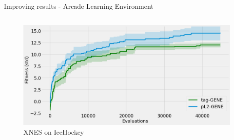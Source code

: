 \begin{frame}{\tciii{} Improving results - Arcade Learning Environment}
{\begin{columns}
      \begin{column}{0.45\linewidth}
        \begin{center}
          \begin{figure}
              \centering
   \includegraphics[width=.9\linewidth]{images/GENE/plots/IceHockey - 128-64-64-18 - xnes.png}
        \small XNES on IceHockey
          \end{figure}
        \end{center}
      \end{column}
    \end{columns}
    }
\end{frame}
